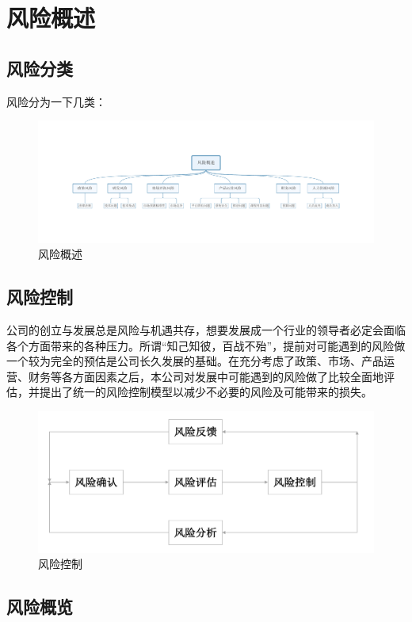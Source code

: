 \section{风险概述}
\subsection{风险分类}

风险分为一下几类：
\begin{figure}[H]
	\centering
	\includegraphics[width=0.9\columnwidth]{figures/risk_summary}
	\caption{风险概述}
	\label{fg:risk_summary}
\end{figure}

\subsection{风险控制}

公司的创立与发展总是风险与机遇共存，想要发展成一个行业的领导者必定会面临各个方面带来的各种压力。所谓“知己知彼，百战不殆”，提前对可能遇到的风险做一个较为完全的预估是公司长久发展的基础。在充分考虑了政策、市场、产品运营、财务等各方面因素之后，本公司对发展中可能遇到的风险做了比较全面地评估，并提出了统一的风险控制模型以减少不必要的风险及可能带来的损失。

\begin{figure}[H]
	\centering
	\includegraphics[width=0.9\columnwidth]{figures/rist_control}
	\caption{风险控制}
	\label{fg:rist_control}
\end{figure}


\subsection{风险概览}

